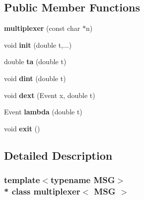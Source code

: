 \subsection*{Public Member Functions}
\begin{DoxyCompactItemize}
\item 
{\bfseries multiplexer} (const char $\ast$n)\hypertarget{classmultiplexer_ad773958bed4b562944c5aa64b51c12e2}{}\label{classmultiplexer_ad773958bed4b562944c5aa64b51c12e2}

\item 
void {\bfseries init} (double t,...)\hypertarget{classmultiplexer_a89d1c7d0d014b6341342bb115b629b39}{}\label{classmultiplexer_a89d1c7d0d014b6341342bb115b629b39}

\item 
double {\bfseries ta} (double t)\hypertarget{classmultiplexer_aad0217a5272cb0ddedbe8f0f09cc848e}{}\label{classmultiplexer_aad0217a5272cb0ddedbe8f0f09cc848e}

\item 
void {\bfseries dint} (double t)\hypertarget{classmultiplexer_a79ad103daf7edca1b9a531cf5357454d}{}\label{classmultiplexer_a79ad103daf7edca1b9a531cf5357454d}

\item 
void {\bfseries dext} (Event x, double t)\hypertarget{classmultiplexer_ab4e33e3c6ee03872ced6d8f74c59d3b5}{}\label{classmultiplexer_ab4e33e3c6ee03872ced6d8f74c59d3b5}

\item 
Event {\bfseries lambda} (double t)\hypertarget{classmultiplexer_ac40185474d904e50800239c9fa12ccbb}{}\label{classmultiplexer_ac40185474d904e50800239c9fa12ccbb}

\item 
void {\bfseries exit} ()\hypertarget{classmultiplexer_afe429c64e63b74d16ec39fb1292b971a}{}\label{classmultiplexer_afe429c64e63b74d16ec39fb1292b971a}

\end{DoxyCompactItemize}


\subsection{Detailed Description}
\subsubsection*{template$<$typename M\+SG$>$\\*
class multiplexer$<$ M\+S\+G $>$}

